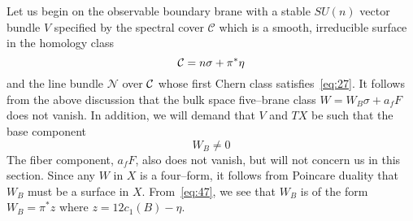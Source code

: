\documentclass[a4paper,12pt]{article}
\numberwithin{equation}{section}
\def\cC{{\mathcal C}}
\def\cN{{\mathcal N}}
\theoremstyle{plain}
\begin{document}
Let us begin on the observable boundary brane 
with a stable  $SU(n)$ vector bundle $V$ specified by the
spectral cover $\cC$ which is a smooth, irreducible surface in the
homology class 
\begin{equation}
{\cal{C}}=n\sigma + \pi^{*}\eta
\label{eq:56}
\end{equation}
and the line bundle $\cN$ over ${\cal{C}}$ whose first Chern class
satisfies~\eqref{eq:27}. It follows from the above discussion that the bulk
space five--brane class $W=W_{B}\sigma+a_{f}F$ does not vanish. 
In addition, we will demand that $V$ and $TX$ be such that the base component
\begin{equation}
W_{B} \neq 0
\label{eq:57}
\end{equation}
The fiber component, $a_{f}F$, also does not vanish, but will not concern us in
this section. Since any $W$ in $X$ is a four--form, it follows from Poincare
duality that $W_{B}$ must be a surface in $X$. From~\eqref{eq:47}, we see that 
$W_{B}$ is of the form $W_{B} = \pi^{*}z$ where $z=12c_{1}(B) - \eta$. 
\end{document}
